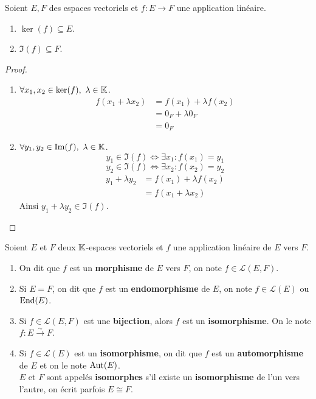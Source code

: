 \begin{theorem}
	Soient $E, F$ des espaces vectoriels et $f : E \to F$ une application linéaire.
	\begin{enumerate}
		\item $\ker(f) \subseteq E$.
		\item $\Im(f) \subseteq F$.
	\end{enumerate}
\end{theorem}

\begin{proof}
	\leavevmode 
	\begin{enumerate}
		\item $\forall x_1, x_2 \in \ker(f),\ \lambda \in \mathbb{K}$.
		\begin{align*}
			f(x_1 + \lambda x_2) &= f(x_1) + \lambda f(x_2) \\ 
								 &= 0_F + \lambda 0_F \\
								 &= 0_F
		\end{align*}
		\item $\forall y_1, y_2 \in \Im(f),\ \lambda \in \mathbb{K}$.
		\[ y_1 \in \Im(f) \iff \exists x_1 : f(x_1) = y_1 \]
		\[ y_2 \in \Im(f) \iff \exists x_2 : f(x_2) = y_2 \]
		\begin{align*}
			y_1 + \lambda y_2 &= f(x_1) + \lambda f(x_2) \\
			                  &= f(x_1 + \lambda x_2)
		\end{align*}
		Ainsi $y_1 + \lambda y_2 \in \Im(f)$.
	\end{enumerate}
\end{proof}

\begin{definition}
    \par \noindent Soient $E$ et $F$ deux $\mathbb{K}$-espaces vectoriels et $f$ une application linéaire de $E$ vers $F$.
    \begin{enumerate}
        \item On dit que $f$ est un \textbf{morphisme} de $E$ vers $F$, on note $f \in \mathcal{L}(E, F)$.
        \item Si $E = F$, on dit que $f$ est un \textbf{endomorphisme} de $E$, on note $f \in \mathcal{L}(E)$ ou $\operatorname{End}(E)$.
        \item Si $f \in \mathcal{L}(E, F)$ est une \textbf{bijection}, alors $f$ est un \textbf{isomorphisme}. On le note $f : E \overset{\sim}{\to} F$.
        \item Si $f \in \mathcal{L}(E)$ est un \textbf{isomorphisme}, on dit que $f$ est un \textbf{automorphisme} de $E$ et on le note $\operatorname{Aut}(E)$.
        \\
        $E$ et $F$ sont appelés \textbf{isomorphes} s'il existe un \textbf{isomorphisme} de l'un vers l'autre, on écrit parfois $E \cong F$.
    \end{enumerate}
\end{definition}

